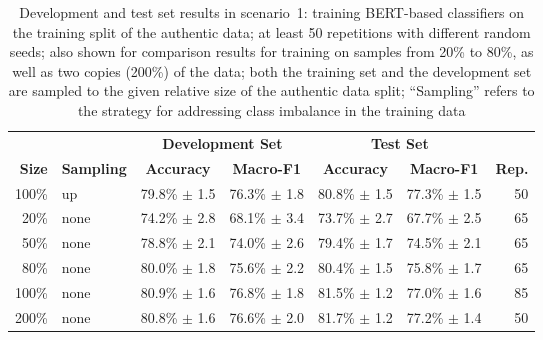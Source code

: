 
\begin{table*}[ht]
\centering
\begin{tabular}{rlccccr}
  &  & \multicolumn{2}{c}{\textbf{Development Set}} & \multicolumn{2}{c}{\textbf{Test Set}} \\
\textbf{Size} & \textbf{Sampling} & \textbf{Accuracy} & \textbf{Macro-F1} & \textbf{Accuracy} & \textbf{Macro-F1} & \textbf{Rep.} \\
\hline
100\%  &  up  &   79.8\% $\pm$    1.5  &   76.3\% $\pm$    1.8  &   80.8\% $\pm$    1.5  &   77.3\% $\pm$    1.5  & 50  \\
\hline
20\%  &  none  &   74.2\% $\pm$    2.8  &   68.1\% $\pm$    3.4  &   73.7\% $\pm$    2.7  &   67.7\% $\pm$    2.5  & 65  \\
50\%  &  none  &   78.8\% $\pm$    2.1  &   74.0\% $\pm$    2.6  &   79.4\% $\pm$    1.7  &   74.5\% $\pm$    2.1  & 65  \\
80\%  &  none  &   80.0\% $\pm$    1.8  &   75.6\% $\pm$    2.2  &   80.4\% $\pm$    1.5  &   75.8\% $\pm$    1.7  & 65  \\
100\%  &  none  &   80.9\% $\pm$    1.6  &   76.8\% $\pm$    1.8  &   81.5\% $\pm$    1.2  &   77.0\% $\pm$    1.6  & 85  \\
200\%  &  none  &   80.8\% $\pm$    1.6  &   76.6\% $\pm$    2.0  &   81.7\% $\pm$    1.2  &   77.2\% $\pm$    1.4  & 50  \\
\hline
\end{tabular}
\caption{Development and test set results in scenario~1: training BERT-based classifiers on the training split of the
authentic data;
at least
50 repetitions with different random seeds;
also shown for comparison results for training on samples
from 20\% to 80\%, as well as two copies (200\%) of the data;
both the training set and the development set are sampled
to the given relative size of the authentic data split;
``Sampling'' refers to the strategy for addressing class imbalance in the training data}
\label{t:results-s1-a}
\end{table*}
